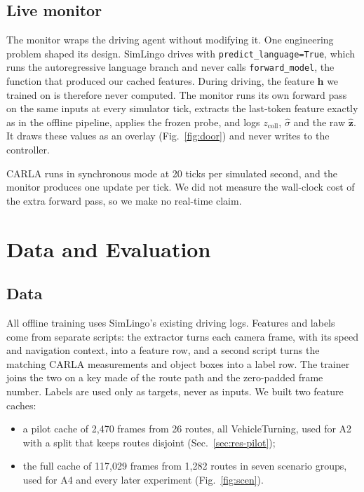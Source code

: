 \documentclass[conference]{IEEEtran}
\newcommand{\zcoll}{z_{\mathrm{coll}}}
\newcommand{\sighat}{\hat{\sigma}}
\newcommand{\code}[1]{\texttt{\small #1}}
\begin{document}
\subsection{Live monitor}
\label{sec:monitor}

The monitor wraps the driving agent without modifying it. One engineering problem
shaped its design. SimLingo drives with \code{predict\_language=True}, which runs
the autoregressive language branch and never calls \code{forward\_model}, the
function that produced our cached features. During driving, the feature
$\mathbf{h}$ we trained on is therefore never computed. The monitor runs its own
forward pass on the same inputs at every simulator tick, extracts the last-token
feature exactly as in the offline pipeline, applies the frozen probe, and logs
$\zcoll$, $\sighat$ and the raw $\hat{\mathbf{z}}$. It draws these values as an
overlay (Fig.~\ref{fig:door}) and never writes to the controller.

CARLA runs in synchronous mode at 20 ticks per simulated second, and the monitor
produces one update per tick. We did not measure the wall-clock cost of the extra
forward pass, so we make no real-time claim.

\section{Data and Evaluation}
\label{sec:eval}

\subsection{Data}

All offline training uses SimLingo's existing driving logs. Features and labels come
from separate scripts: the extractor turns each camera frame, with its speed and
navigation context, into a feature row, and a second script turns the matching
CARLA measurements and object boxes into a label row. The trainer joins the two on a
key made of the route path and the zero-padded frame number. Labels are used only as
targets, never as inputs. We built two feature caches:
\begin{itemize}
\item a pilot cache of 2{,}470 frames from 26 routes, all VehicleTurning, used for
A2 with a split that keeps routes disjoint (Sec.~\ref{sec:res-pilot});
\item the full cache of 117{,}029 frames from 1{,}282 routes in seven scenario
groups, used for A4 and every later experiment (Fig.~\ref{fig:scen}).
\end{itemize}
\end{document}
